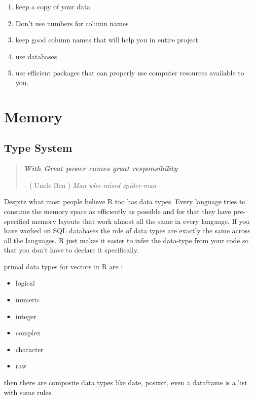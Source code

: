 \documentclass[
]{book}
\providecommand{\tightlist}{%
  \setlength{\itemsep}{0pt}\setlength{\parskip}{0pt}}
\begin{document}
\begin{enumerate}
\def\labelenumi{\arabic{enumi}.}
\tightlist
\item
  keep a copy of your data
\item
  Don't use numbers for column names
\item
  keep good column names that will help you in entire project
\item
  use databases
\item
  use efficient packages that can properly use computer resources available to you.
\end{enumerate}

\hypertarget{part-memory}{%
\part{Memory}\label{part-memory}}

\hypertarget{types}{%
\chapter{Type System}\label{types}}

\begin{quote}
\textbf{\emph{With Great power comes great responsibility}}

-- ( Uncle Ben ) \emph{Man who raised spider-man}
\end{quote}

Despite what most people believe R too has data types. Every language tries to consume the memory space as efficiently as possible and for that they have pre-specified memory layouts that work almost all the same in every language. If you have worked on SQL databases the role of data types are exactly the same across all the languages. R just makes it easier to infer the data-type from your code so that you don't have to declare it specifically.

primal data types for vectors in R are :

\begin{itemize}
\item
  logical
\item
  numeric
\item
  integer
\item
  complex
\item
  character
\item
  raw
\end{itemize}

then there are composite data types like date, posixct, even a dataframe is a list with some rules.
\end{document}
